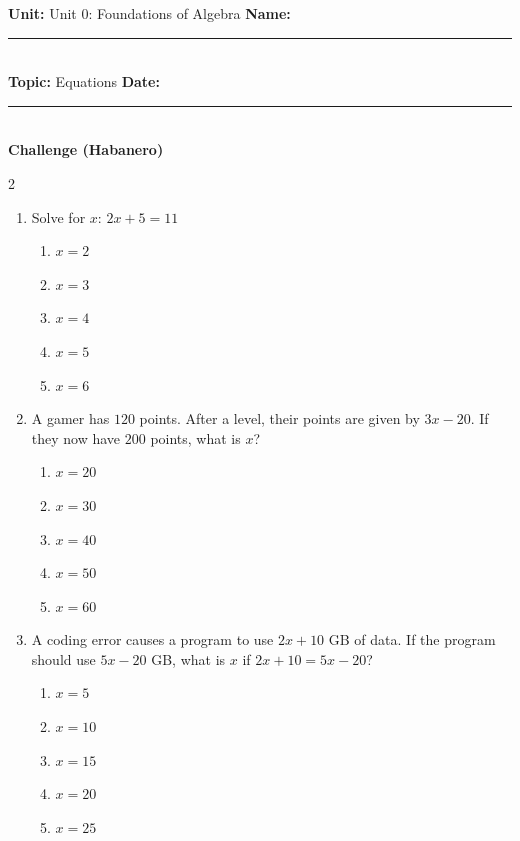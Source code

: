 \documentclass[10pt]{article}
\begin{document}
\enlargethispage{2.5cm}

\begin{tcolorbox}[colback=mainblue!5, colframe=mainblue, sharp corners, boxrule=0.5pt]
    \small \textbf{Unit:} Unit 0: Foundations of Algebra \hfill \textbf{Name:} \rule{3cm}{0.4pt} \\
    \small \textbf{Topic:} Equations \hfill \textbf{Date:} \rule{2cm}{0.4pt} \\
    \centering \textbf{\large Challenge (Habanero)}
\end{tcolorbox}

\vspace{0.2cm}

\begin{multicols}{2}
\begin{enumerate}[label=\textbf{Q\arabic*.}, leftmargin=*, itemsep=6pt, parsep=0pt]

  \item \small Solve for $x$: $2x + 5 = 11$
  \begin{enumerate}[label=(\Alph*), leftmargin=0.6cm, nosep, itemsep=2pt]
    \item $x = 2$
    \item $x = 3$
    \item $x = 4$
    \item $x = 5$
    \item $x = 6$
  \end{enumerate}

  \item \small A gamer has $120$ points. After a level, their points are given by $3x - 20$. If they now have $200$ points, what is $x$?
  \begin{enumerate}[label=(\Alph*), leftmargin=0.6cm, nosep, itemsep=2pt]
    \item $x = 20$
    \item $x = 30$
    \item $x = 40$
    \item $x = 50$
    \item $x = 60$
  \end{enumerate}

  \item \small A coding error causes a program to use $2x + 10$ GB of data. If the program should use $5x - 20$ GB, what is $x$ if $2x + 10 = 5x - 20$?
  \begin{enumerate}[label=(\Alph*), leftmargin=0.6cm, nosep, itemsep=2pt]
    \item $x = 5$
    \item $x = 10$
    \item $x = 15$
    \item $x = 20$
    \item $x = 25$
  \end{enumerate}


\end{enumerate}
\end{multicols}
\end{document}
